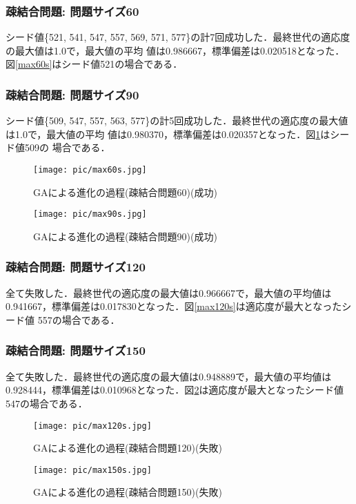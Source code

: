 \documentclass[a4j]{jarticle}
\begin{document}
\subsubsection*{疎結合問題: 問題サイズ60}
シード値\{521, 541, 547, 557, 569, 571, 577\}の計7回成功した．最終世代の適応度の最大値は1.0で，最大値の平均
値は0.986667，標準偏差は0.020518となった．図\ref{max60s}はシード値521の場合である．
\subsubsection*{疎結合問題: 問題サイズ90}
シード値\{509, 547, 557, 563, 577\}の計5回成功した．最終世代の適応度の最大値は1.0で，最大値の平均
値は0.980370，標準偏差は0.020357となった．図\ref{max90s}はシード値509の
場合である．
\begin{figure}[htb]
 \begin{minipage}{0.5\hsize}
  \begin{center}
  \texttt{[image: pic/max60s.jpg]}
  \end{center}
  \caption{GAによる進化の過程(疎結合問題60)(成功)}
  \label{max60s}
 \end{minipage}
 \begin{minipage}{0.5\hsize}
  \begin{center}
  \texttt{[image: pic/max90s.jpg]}
  \end{center}
  \caption{GAによる進化の過程(疎結合問題90)(成功)}
  \label{max90s}
 \end{minipage}
\end{figure}

\clearpage
\subsubsection*{疎結合問題: 問題サイズ120}
全て失敗した．最終世代の適応度の最大値は0.966667で，最大値の平均値は
0.941667，標準偏差は0.017830となった．図\ref{max120s}は適応度が最大となったシード値
557の場合である．
\subsubsection*{疎結合問題: 問題サイズ150}
全て失敗した．最終世代の適応度の最大値は0.948889で，最大値の平均値は
0.928444，標準偏差は0.010968となった．図\ref{max150s}は適応度が最大となったシード値
547の場合である．
\begin{figure}[htb]
 \begin{minipage}{0.5\hsize}
  \begin{center}
  \texttt{[image: pic/max120s.jpg]}
  \end{center}
  \caption{GAによる進化の過程(疎結合問題120)(失敗)}
  \label{max120s}
 \end{minipage}
 \begin{minipage}{0.5\hsize}
  \begin{center}
  \texttt{[image: pic/max150s.jpg]}
  \end{center}
  \caption{GAによる進化の過程(疎結合問題150)(失敗)}
  \label{max150s}
 \end{minipage}
\end{figure}
\clearpage
\end{document}
